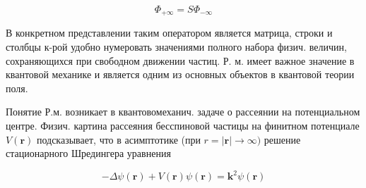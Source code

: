 \documentclass[10pt]{article}
\begin{document}
\[

\Phi_{+\infty}=S \Phi_{-\infty}

\]



В конкретном представлении таким оператором является матрица, строки и столбцы к-рой удобно нумеровать значениями полного набора физич. величин, сохраняющихся при свободном движении частиц. Р. м. имеет важное значение в квантовой механике и является одним из основных объектов в квантовой теории поля.



Понятие Р.м. возникает в квантовомеханич. задаче о рассеянии на потенциальном центре. Физич. картина рассеяния бесспиновой частицы на финитном потенциале $V(\boldsymbol{r})$ подсказывает, что в асимптотике (при $r=|\boldsymbol{r}| \rightarrow \infty)$ решение стационарного Шредингера уравнения



\[

-\Delta \psi(\boldsymbol{r})+V(\boldsymbol{r}) \psi(\boldsymbol{r})=\boldsymbol{k}^{2} \psi(\boldsymbol{r})

\]
\end{document}
